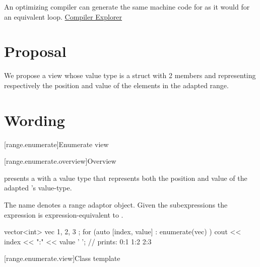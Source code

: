 \documentclass{wg21}
\begin{document}
An optimizing compiler can generate the same machine code for  as it would for an equivalent  loop.  \href{https://godbolt.org/z/qpu2fm}{Compiler Explorer}

\section{Proposal}

We propose a view  whose value type is a struct with 2 members  and 
representing respectively the position and value of the elements in the adapted range. 

\section{Wording}

[range.enumerate]{Enumerate view}

[range.enumerate.overview]{Overview}

\pnum
{} presents a  with a value type that represents both the position and value of the adapted 's value-type.

\pnum
The name  denotes a
range adaptor object.
Given the subexpressions 
the expression  is expression-equivalent to .

\pnum
\begin{example}
\begin{codeblock}
vector<int> vec{ 1, 2, 3 };
for (auto [index, value] : enumerate(vec) )
    cout << index << ":" << value ' '; // prints: 0:1 1:2 2:3
\end{codeblock}
\end{example}
        
[range.enumerate.view]{Class template }
\end{document}
